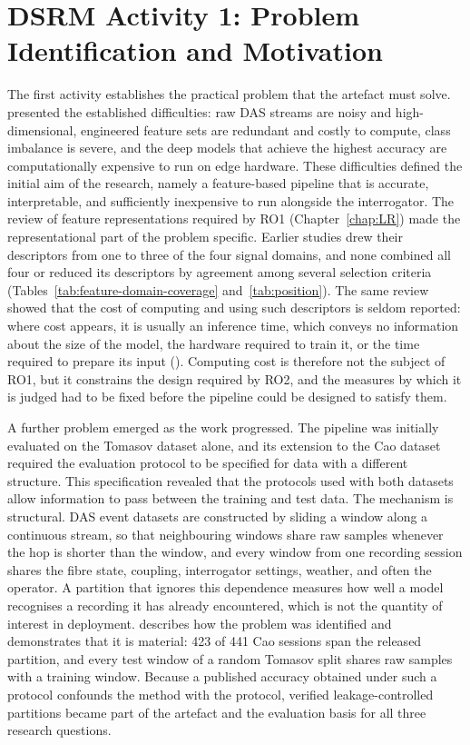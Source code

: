 \section{DSRM Activity 1: Problem Identification and Motivation}
\label{sec:chap3DSRMProblem}
The first activity establishes the practical problem that the artefact must solve.  presented the established difficulties: raw DAS streams are noisy and high-dimensional, engineered feature sets are redundant and costly to compute, class imbalance is severe, and the deep models that achieve the highest accuracy are computationally expensive to run on edge hardware. These difficulties defined the initial aim of the research, namely a feature-based pipeline that is accurate, interpretable, and sufficiently inexpensive to run alongside the interrogator. The review of feature representations required by RO1 (Chapter~\ref{chap:LR}) made the representational part of the problem specific. Earlier studies drew their descriptors from one to three of the four signal domains, and none combined all four or reduced its descriptors by agreement among several selection criteria (Tables~\ref{tab:feature-domain-coverage} and~\ref{tab:position}). The same review showed that the cost of computing and using such descriptors is seldom reported: where cost appears, it is usually an inference time, which conveys no information about the size of the model, the hardware required to train it, or the time required to prepare its input (). Computing cost is therefore not the subject of RO1, but it constrains the design required by RO2, and the measures by which it is judged had to be fixed before the pipeline could be designed to satisfy them.

A further problem emerged as the work progressed. The pipeline was initially evaluated on the Tomasov dataset alone, and its extension to the Cao dataset required the evaluation protocol to be specified for data with a different structure. This specification revealed that the protocols used with both datasets allow information to pass between the training and test data. The mechanism is structural. DAS event datasets are constructed by sliding a window along a continuous stream, so that neighbouring windows share raw samples whenever the hop is shorter than the window, and every window from one recording session shares the fibre state, coupling, interrogator settings, weather, and often the operator. A partition that ignores this dependence measures how well a model recognises a recording it has already encountered, which is not the quantity of interest in deployment.  describes how the problem was identified and demonstrates that it is material: 423 of 441 Cao sessions span the released partition, and every test window of a random Tomasov split shares raw samples with a training window. Because a published accuracy obtained under such a protocol confounds the method with the protocol, verified leakage-controlled partitions became part of the artefact and the evaluation basis for all three research questions.

